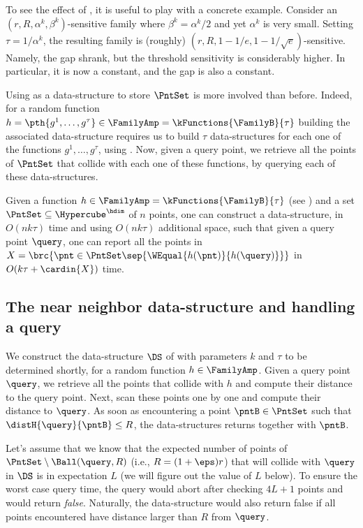 To see the effect of , it is useful to play with a
concrete example. Consider an $(r,R,\alpha^k,\beta^k)$-sensitive
family where $\beta^k = \alpha^k/2$ and yet $\alpha^k$ is very
small. Setting $\tau = 1/\alpha^k$, the resulting family is (roughly)
$(r, R, 1-1/e, 1-1/\sqrt{e})$-sensitive. Namely, the gap shrank, but
the threshold sensitivity is considerably higher. In particular, it is
now a constant, and the gap is also a constant.

Using  as a data-structure to store $\PntSet$ is
more involved than before. Indeed, for a random function $h =
\pth{g^1, \ldots, g^\tau} \in \FamilyAmp =
\kFunctions{\FamilyB}{\tau}$ building the associated data-structure
requires us to build $\tau$ data-structures for each one of the
functions $g^1,\ldots, g^\tau$, using . Now, given a
query point, we retrieve all the points of $\PntSet$ that collide with
each one of these functions, by querying each of these
data-structures.

\begin{lemma}    
    Given a function $h \in \FamilyAmp= \kFunctions{\FamilyB}{\tau}$
    (see ) and a set $\PntSet \subseteq
    \Hypercube^\hdim$ of $n$ points, one can construct a
    data-structure, in $O(nk\tau)$ time and using $O(nk\tau)$
    additional space, such that given a query point $\query$, one can
    report all the points in $X = \brc{ \pnt \in \PntSet \sep{
          \WEqual{h(\pnt)}{h(\query)}}}$ in $O( k\tau + \cardin{X} )$
    time.
\end{lemma}


\subsection{The near neighbor data-structure and handling a query}


We construct the data-structure $\DS$ of  with
parameters $k$ and $\tau$ to be determined shortly, for a random
function $h \in \FamilyAmp$. Given a query point $\query$, we retrieve
all the points that collide with $h$ and compute their distance to the
query point. Next, scan these points one by one and compute their
distance to $\query$. As soon as encountering a point $\pntB \in
\PntSet$ such that $\distH{\query}{\pntB} \leq R$, the data-structures
returns  together with $\pntB$. 

Let's assume that we know that the expected number of points of
$\PntSet \setminus \Ball(\query,R)$ (i.e., $R = (1+\eps)r$) that will
collide with $\query$ in $\DS$ is in expectation $L$ (we will figure
out the value of $L$ below). To ensure the worst case query time, the
query would abort after checking $4L + 1$ points and would return
\emph{false}. Naturally, the data-structure would also return false if
all points encountered have distance larger than $R$ from $\query$.

